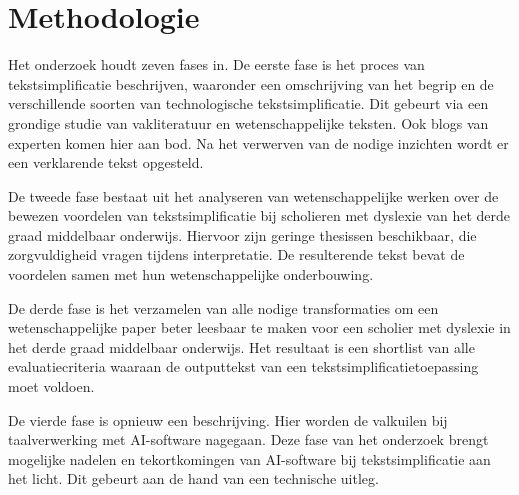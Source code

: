 
\section{Methodologie}%
\label{sec:methodologie}


Het onderzoek houdt zeven fases in. De eerste fase is het proces van tekstsimplificatie beschrijven, waaronder een omschrijving van het begrip en de verschillende soorten van technologische tekstsimplificatie. Dit gebeurt via een grondige studie van vakliteratuur en wetenschappelijke teksten. Ook blogs van experten komen hier aan bod. Na het verwerven van de nodige inzichten wordt er een verklarende tekst opgesteld.

De tweede fase bestaat uit het analyseren van wetenschappelijke werken over de bewezen voordelen van tekstsimplificatie bij scholieren met dyslexie van het derde graad middelbaar onderwijs. Hiervoor zijn geringe thesissen beschikbaar, die zorgvuldigheid vragen tijdens interpretatie. De resulterende tekst bevat de voordelen samen met hun wetenschappelijke onderbouwing.

De derde fase is het verzamelen van alle nodige transformaties om een wetenschappelijke paper beter leesbaar te maken voor een scholier met dyslexie in het derde graad middelbaar onderwijs. Het resultaat is een shortlist van alle evaluatiecriteria waaraan de outputtekst van een tekstsimplificatietoepassing moet voldoen.

De vierde fase is opnieuw een beschrijving. Hier worden de valkuilen bij taalverwerking met AI-software nagegaan. Deze fase van het onderzoek brengt mogelijke nadelen en tekortkomingen van AI-software bij tekstsimplificatie aan het licht. Dit gebeurt aan de hand van een technische uitleg.

